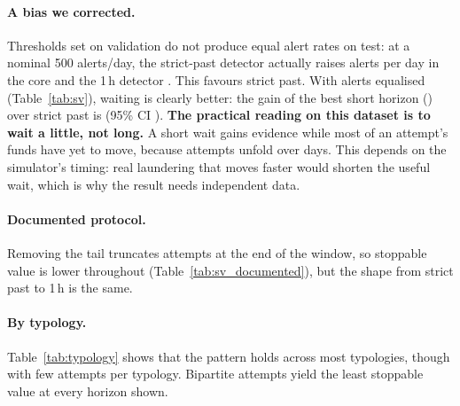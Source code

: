 \documentclass[11pt,a4paper]{article}
\begin{document}
\begin{table}[htbp]
\centering
\small
\caption{Stoppable value at 500 alerts/day under two threshold rules, HI-Small, Released protocol. ``Val.'' sets thresholds on validation, as a deployment would. ``Equal alerts'' gives every horizon the same alert count on the test window, as a sensitivity analysis. ``Transfers'' is the transfer-count analogue of SV.}
\label{tab:sv}
\resizebox{\textwidth}{!}{}
\end{table}

\paragraph{A bias we corrected.} Thresholds set on validation do not produce equal alert rates on test: at a nominal 500 alerts/day, the strict-past detector actually raises \AlertsStrict{} alerts per day in the core and the 1\,h detector \AlertsHour. This favours strict past. With alerts equalised (Table~\ref{tab:sv}), waiting is clearly better: the gain of the best short horizon (\HISCThreeTestBest) over strict past is \HISWaitGainTest{} (95\% CI \HISWaitGainTestCI). \textbf{The practical reading on this dataset is to wait a little, not long.} A short wait gains evidence while most of an attempt's funds have yet to move, because attempts unfold over days. This depends on the simulator's timing: real laundering that moves faster would shorten the useful wait, which is why the result needs independent data.

\paragraph{Documented protocol.} Removing the tail truncates attempts at the end of the window, so stoppable value is lower throughout (Table~\ref{tab:sv_documented}), but the shape from strict past to 1\,h is the same.

\begin{table}[htbp]
\centering
\small
\caption{Stoppable value at 500 alerts/day, HI-Small, Documented protocol. Only horizons with all three seeds complete are shown; the run was stopped before 6\,h.}
\label{tab:sv_documented}
\resizebox{\textwidth}{!}{}
\end{table}

\paragraph{By typology.} Table~\ref{tab:typology} shows that the pattern holds across most typologies, though with few attempts per typology. Bipartite attempts yield the least stoppable value at every horizon shown.
\end{document}
